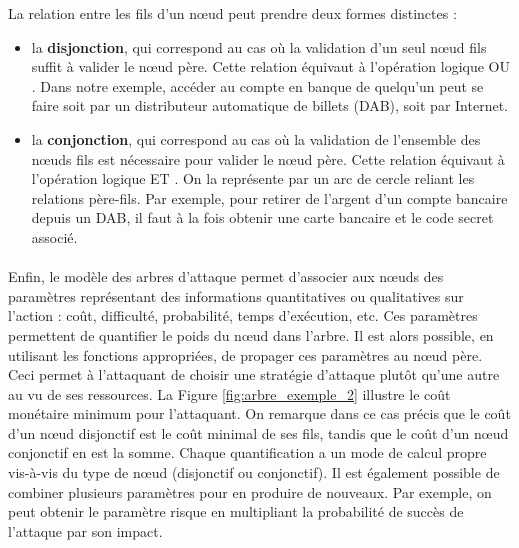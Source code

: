         La relation entre les fils d'un nœud peut prendre deux formes distinctes :
        \begin{itemize}

            \item la {\bf disjonction}, qui correspond au cas où la validation d'un seul nœud fils suffit à valider le nœud père. Cette relation équivaut à l'opération logique \og OU \fg{}. Dans notre exemple, accéder au compte en banque de quelqu'un peut se faire soit par un distributeur automatique de billets (DAB), soit par Internet.

            
            \item la {\bf conjonction}, qui correspond au cas où la validation de l'ensemble des nœuds fils est nécessaire pour valider le nœud père. Cette relation équivaut à l'opération logique \og ET \fg{}. On la représente par un arc de cercle reliant les relations père-fils. Par exemple, pour retirer de l'argent d'un compte bancaire depuis un DAB, il faut à la fois obtenir une carte bancaire et le code secret associé.
        \end{itemize} 
	

	\paragraph{}

        Enfin, le modèle des arbres d'attaque permet d'associer aux nœuds des paramètres représentant des informations quantitatives ou qualitatives sur l'action : coût, difficulté, probabilité, temps d'exécution, etc. Ces paramètres permettent de quantifier le poids du nœud dans l'arbre. Il est alors possible, en utilisant les fonctions appropriées, de propager ces paramètres au nœud père. Ceci permet à l'attaquant de choisir une stratégie d'attaque plutôt qu'une autre au vu de ses ressources. La Figure \ref{fig:arbre_exemple_2} illustre le coût monétaire minimum pour l'attaquant. On remarque dans ce cas précis que le coût d'un nœud disjonctif est le coût minimal de ses fils, tandis que le coût d'un nœud conjonctif en est la somme. Chaque quantification a un mode de calcul propre vis-à-vis du type de nœud (disjonctif ou conjonctif). Il est également possible de combiner plusieurs paramètres pour en produire de nouveaux. Par exemple, on peut obtenir le paramètre \og risque \fg{}  en multipliant la \og probabilité de succès\fg{} de l'attaque par son \og impact\fg{}.

